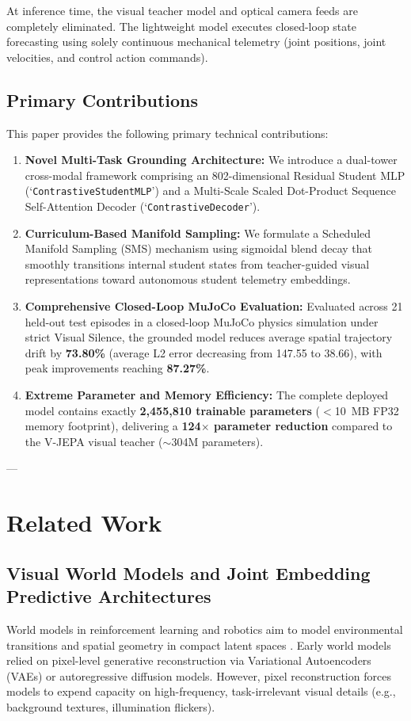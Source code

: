 \documentclass[11pt,a4paper]{article}
\begin{document}
At inference time, the visual teacher model and optical camera feeds are completely eliminated. The lightweight model executes closed-loop state forecasting using solely continuous mechanical telemetry (joint positions, joint velocities, and control action commands).

\subsection{Primary Contributions}
This paper provides the following primary technical contributions:
\begin{enumerate}
    \item \textbf{Novel Multi-Task Grounding Architecture:} We introduce a dual-tower cross-modal framework comprising an 802-dimensional Residual Student MLP (`\texttt{ContrastiveStudentMLP}') and a Multi-Scale Scaled Dot-Product Sequence Self-Attention Decoder (`\texttt{ContrastiveDecoder}').
    \item \textbf{Curriculum-Based Manifold Sampling:} We formulate a Scheduled Manifold Sampling (SMS) mechanism using sigmoidal blend decay that smoothly transitions internal student states from teacher-guided visual representations toward autonomous student telemetry embeddings.
    \item \textbf{Comprehensive Closed-Loop MuJoCo Evaluation:} Evaluated across 21 held-out test episodes in a closed-loop MuJoCo physics simulation under strict Visual Silence, the grounded model reduces average spatial trajectory drift by \textbf{73.80\%} (average L2 error decreasing from 147.55 to 38.66), with peak improvements reaching \textbf{87.27\%}.
    \item \textbf{Extreme Parameter and Memory Efficiency:} The complete deployed model contains exactly \textbf{2,455,810 trainable parameters} ($<$10~MB FP32 memory footprint), delivering a \textbf{124$\times$ parameter reduction} compared to the V-JEPA visual teacher ($\sim$304M parameters).
\end{enumerate}

---

\section{Related Work}
\label{sec:related_work}

\subsection{Visual World Models and Joint Embedding Predictive Architectures}
World models in reinforcement learning and robotics aim to model environmental transitions and spatial geometry in compact latent spaces \cite{ha2018world, hafner2019dream, hafner2020mastering, lecun2022path}. Early world models relied on pixel-level generative reconstruction via Variational Autoencoders (VAEs) or autoregressive diffusion models. However, pixel reconstruction forces models to expend capacity on high-frequency, task-irrelevant visual details (e.g., background textures, illumination flickers).
\end{document}
